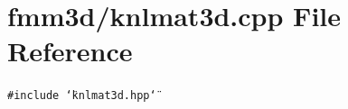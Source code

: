 \section{fmm3d/knlmat3d.cpp File Reference}
\label{knlmat3d_8cpp}


{\tt \#include \char`\"{}knlmat3d.hpp\char`\"{}}\par
